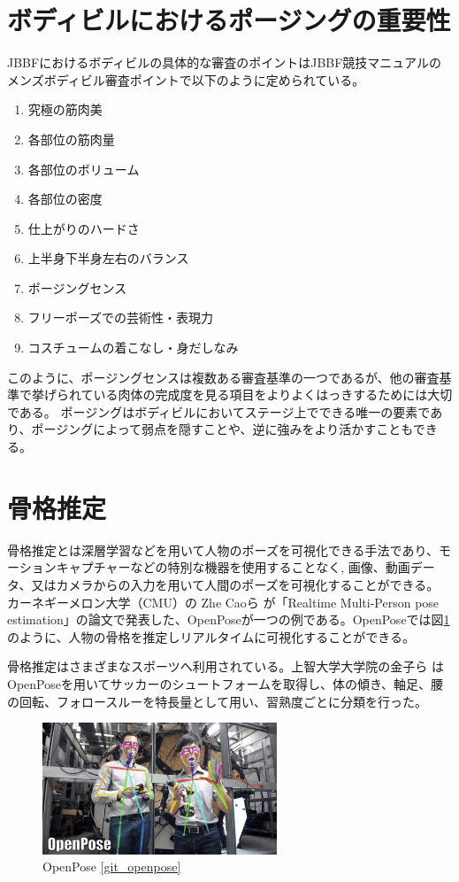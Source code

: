 \section{ボディビルにおけるポージングの重要性}
JBBFにおけるボディビルの具体的な審査のポイントはJBBF競技マニュアルのメンズボディビル審査ポイントで以下のように定められている\cite{JBBF2023}。

\begin{enumerate}
  \item 究極の筋肉美
  \item 各部位の筋肉量
  \item 各部位のボリューム
  \item 各部位の密度
  \item 仕上がりのハードさ
  \item 上半身下半身左右のバランス
  \item ポージングセンス
  \item フリーポーズでの芸術性・表現力
  \item コスチュームの着こなし・身だしなみ
\end{enumerate}
このように、ポージングセンスは複数ある審査基準の一つであるが、他の審査基準で挙げられている肉体の完成度を見る項目をよりよくはっきするためには大切である。
ポージングはボディビルにおいてステージ上でできる唯一の要素であり、ポージングによって弱点を隠すことや、逆に強みをより活かすこともできる。


\section{骨格推定}
骨格推定とは深層学習などを用いて人物のポーズを可視化できる手法であり、モーションキャプチャーなどの特別な機器を使用することなく,
画像、動画データ、又はカメラからの入力を用いて人間のポーズを可視化することができる。
カーネギーメロン大学（CMU）の Zhe Caoら が「Realtime Multi-Person pose estimation」\cite{openpose}の論文で発表した、OpenPoseが一つの例である。OpenPoseでは図\ref{fig:openpose}のように、人物の骨格を推定しリアルタイムに可視化することができる。


骨格推定はさまざまなスポーツへ利用されている。上智大学大学院の金子ら \cite{soccer_openpose}はOpenPoseを用いてサッカーのシュートフォームを取得し、体の傾き、軸足、腰の回転、フォロースルーを特長量として用い、習熟度ごとに分類を行った。
\begin{figure}[htbp]
    \begin{center}
        \includegraphics[width=7cm]{figures/openpose.png}
        \caption{OpenPose \ref{git_openpose}}
        \label{fig:openpose}
    \end{center}
  \end{figure}
